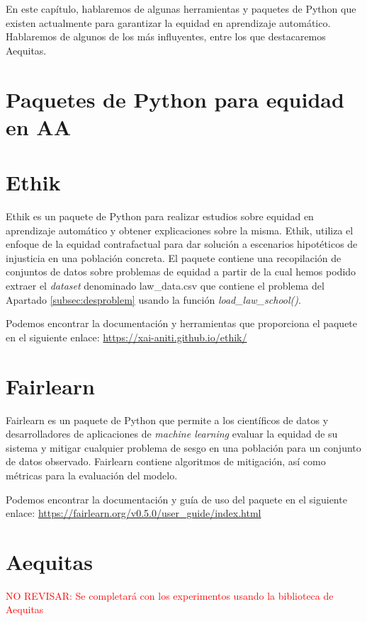 En este capítulo, hablaremos de algunas herramientas y paquetes de Python que existen actualmente para garantizar la equidad en aprendizaje automático. Hablaremos de algunos de los más influyentes, entre los que destacaremos Aequitas. 

\section{Paquetes de Python para equidad en AA}

\section*{Ethik}

Ethik es un paquete de Python para realizar estudios sobre equidad en aprendizaje automático y obtener explicaciones sobre la misma. Ethik, utiliza el enfoque de la equidad contrafactual para dar solución a escenarios hipotéticos de injusticia en una población concreta. El paquete contiene una recopilación de conjuntos de datos sobre problemas de equidad a partir de la cual hemos podido extraer el \textit{dataset} denominado law\_data.csv que contiene el problema del Apartado \ref{subsec:desproblem} usando la función \textit{load\_law\_school()}.

Podemos encontrar la documentación y herramientas que proporciona el paquete en el siguiente enlace: \url{https://xai-aniti.github.io/ethik/}

\section*{Fairlearn}

Fairlearn es un paquete de Python que permite a los científicos de datos y desarrolladores de aplicaciones de \textit{machine learning} evaluar la equidad de su sistema y mitigar cualquier problema de sesgo en una población para un conjunto de datos observado. Fairlearn contiene  algoritmos de mitigación, así como métricas para la evaluación del modelo.

Podemos encontrar la documentación y guía de uso del paquete en el siguiente enlace: \url{https://fairlearn.org/v0.5.0/user_guide/index.html}

\section{Aequitas}

\textcolor{red}{NO REVISAR: Se completará con los experimentos usando la biblioteca de Aequitas}

